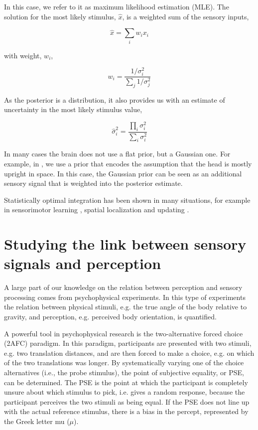 In this case, we refer to it as maximum likelihood estimation (MLE). The solution for the most likely stimulus, $\hat{x}$, is a weighted sum of the sensory inputs,

\begin{equation}
\hat{x}=\sum_i w_i x_i
\end{equation}

with weight, $w_i$,

\begin{equation}
w_i = \frac{1/\sigma^2_i}{\sum_j 1/\sigma^2_j}
\end{equation}

As the posterior is a distribution, it also provides us with an estimate of uncertainty in  the most likely stimulus value,

\begin{equation}
\hat{\sigma}^2_i = \frac{\prod_i \sigma^2_i}{\sum_i \sigma^2_i}
\end{equation}

In many cases the brain does not use a flat prior, but a Gaussian one. For example, in , we use a prior that encodes the assumption that the head is mostly upright in space. In this case, the Gaussian prior can be seen as an additional sensory signal that is weighted into the posterior estimate.

Statistically optimal integration has been shown in many situations, for example in sensorimotor learning \cite{kording2004}, spatial localization \cite{battaglia2003} and updating \cite{vaziri2006}.


\section{Studying the link between sensory signals and perception}

A large part of our knowledge on the relation between perception and sensory processing comes from psychophysical experiments. In this type of experiments the relation between physical stimuli, e.g. the true angle of the body relative to gravity, and perception, e.g. perceived body orientation, is quantified.

A powerful tool in psychophysical research is the two-alternative forced choice (2AFC) paradigm. In this paradigm, participants are presented with two stimuli, e.g. two translation distances, and are then forced to make a choice, e.g. on which of the two translations was longer. By systematically varying one of the choice alternatives (i.e., the probe stimulus), the point of subjective equality, or PSE, can be determined. The PSE is the point at which the participant is completely unsure about which stimulus to pick, i.e. gives a random response, because the participant perceives the two stimuli as being equal. If the PSE does not line up with the actual reference stimulus, there is a bias in the percept, represented by the Greek letter mu ($\mu$).


